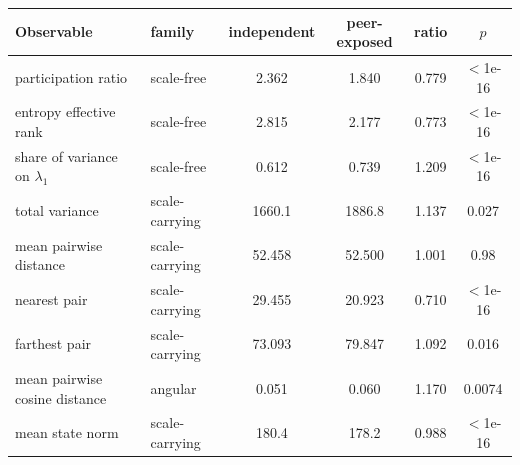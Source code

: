 \begin{tabular}{llcccc}
\toprule
Observable & family & independent & peer-exposed & ratio & $p$ \\
\midrule
participation ratio & scale-free & 2.362 & 1.840 & 0.779 & $<$1e-16 \\
entropy effective rank & scale-free & 2.815 & 2.177 & 0.773 & $<$1e-16 \\
share of variance on $\lambda_1$ & scale-free & 0.612 & 0.739 & 1.209 & $<$1e-16 \\
total variance & scale-carrying & 1660.1 & 1886.8 & 1.137 & 0.027 \\
mean pairwise distance & scale-carrying & 52.458 & 52.500 & 1.001 & 0.98 \\
nearest pair & scale-carrying & 29.455 & 20.923 & 0.710 & $<$1e-16 \\
farthest pair & scale-carrying & 73.093 & 79.847 & 1.092 & 0.016 \\
mean pairwise cosine distance & angular & 0.051 & 0.060 & 1.170 & 0.0074 \\
mean state norm & scale-carrying & 180.4 & 178.2 & 0.988 & $<$1e-16 \\
\bottomrule
\end{tabular}
